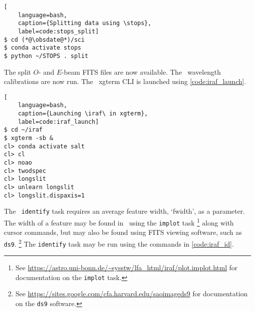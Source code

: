 \begin{lstlisting}[
    language=bash,
    caption={Splitting data using \stops},
    label=code:stops_split]
$ cd (*@\obsdate@*)/sci
$ conda activate stops
$ python ~/STOPS . split
\end{lstlisting}

The split $O$- and $E$-beam \gls{FITS} files are now available. The \iraf\ wavelength calibrations are now run. The \iraf\ xgterm \gls{CLI} is launched using \autoref{code:iraf_launch}.

\begin{lstlisting}[
    language=bash,
    caption={Launching \iraf\ in xgterm},
    label=code:iraf_launch]
$ cd ~/iraf
$ xgterm -sb &
cl> conda activate salt
cl> cl
cl> noao
cl> twodspec
cl> longslit
cl> unlearn longslit
cl> longslit.dispaxis=1
\end{lstlisting}

\pagebreak

The \iraf\ \texttt{identify} task requires an average feature width, `fwidth', as a parameter. The width of a feature may be found in \iraf\ using the \texttt{implot} task%
\footnote{See \protect\url{https://astro.uni-bonn.de/~sysstw/lfa_html/iraf/plot.implot.html} for documentation on the \texttt{implot} task.}
along with cursor commands, but may also be found using \gls{FITS} viewing software, such as \texttt{ds9}.%
\footnote{See \protect\url{https://sites.google.com/cfa.harvard.edu/saoimageds9} for documentation on the \texttt{ds9} software.}
The \texttt{identify} task may be run using the commands in \autoref{code:iraf_id}.

